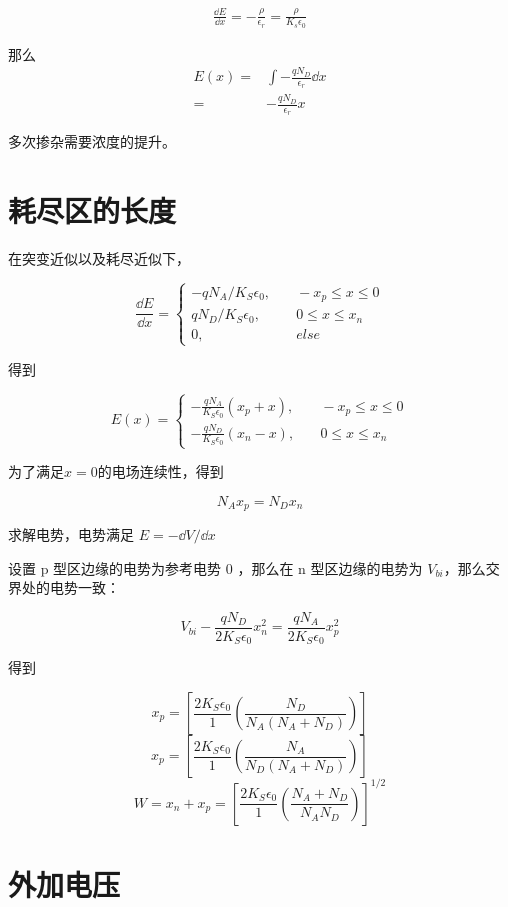 \documentclass[cn,11pt,chinese,black,simple]{../elegantbook}
\begin{document}
\[
    \begin{aligned}
        \frac{\dd{E}}{\dd{x}} = - \frac{\rho}{\epsilon_r} = \frac{\rho}{K_s \epsilon_0} 
    \end{aligned}
\]

那么 \[\begin{aligned}
    E(x) =& \int - \frac{q N_D}{\epsilon_r} \dd{x} \\
    =& -\frac{q N_D}{\epsilon_r} x
\end{aligned}\]


多次掺杂需要浓度的提升。

\section{耗尽区的长度}

在突变近似以及耗尽近似下，

\[\frac{\dd{E}}{\dd{x}} = \left\{\begin{aligned}
    - q N_A / K_S \epsilon_0, &\quad -x_p \leq x \leq 0 \\
    q N_D / K_S \epsilon_0, &\quad 0 \leq x \leq x_n \\
    0, &\quad else 
\end{aligned}\right.\]

得到 

\[E(x) = \left\{
\begin{aligned}
    - \frac{q N_A}{K_S \epsilon_0} (x_p + x), &\quad -x_p \leq x \leq 0 \\
    - \frac{q N_D}{K_S \epsilon_0} (x_n - x), &\quad 0 \leq x \leq x_n 
\end{aligned}    
\right.\]

为了满足\(x = 0\)的电场连续性，得到 

\[N_A x_p = N_D x_n\]

求解电势，电势满足 \(E = -\dd{V}/\dd{x}\)

设置 p 型区边缘的电势为参考电势 \(0\) ，那么在 n 型区边缘的电势为 \(V_{bi}\)，那么交界处的电势一致：

\[V_{bi} - \frac{q N_D}{2 K_S \epsilon_0}x_n^2 = \frac{q N_A}{2 K_S \epsilon_0}x_p^2\]

得到

\[x_p = \left[\frac{2 K_S \epsilon_0}{1} \left(\frac{N_D}{N_A(N_A+N_D)}\right)\right]\]
\[x_p = \left[\frac{2 K_S \epsilon_0}{1} \left(\frac{N_A}{N_D(N_A+N_D)}\right)\right]\]
\[W = x_n + x_p = \left[\frac{2 K_S \epsilon_0}{1} \left(\frac{N_A + N_D}{N_AN_D}\right)\right]^{1/2}\]

\section{外加电压}
\end{document}
